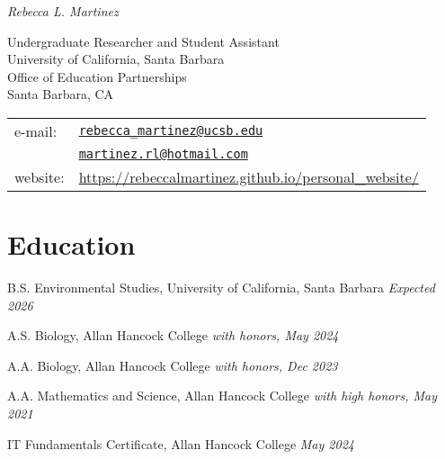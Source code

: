 \documentclass[letterpaper]{article}
\renewenvironment{itemize}{
  \begin{list}{}{
    \setlength{\leftmargin}{1.5em}
  }
}{
  \end{list}
}
\begin{document}
\centerline{\huge}
\begin{center}
  \emph{Rebecca L. Martinez}
\end{center}


\vspace{0.25in}

\begin{minipage}{0.55\linewidth}
Undergraduate Researcher and Student Assistant\\
University of California, Santa Barbara\\
Office of Education Partnerships\\
Santa Barbara, CA
\end{minipage}
\begin{minipage}{0.45\linewidth}
  \begin{tabular}{ll}
    e-mail: & \href{mailto:rebecca_martinez@ucsb.edu}{\tt rebecca\_martinez@ucsb.edu} \\
            & \href{mailto:martinez.rl@hotmail.com}{\tt martinez.rl@hotmail.com} \\
    website: & \href{https://rebeccalmartinez.github.io/personal_website/}{\url{https://rebeccalmartinez.github.io/personal_website/}}

  \end{tabular}
\end{minipage}


\section*{Education}


\begin{itemize}
  \item B.S. Environmental Studies, University of California, Santa Barbara  
  \emph{Expected 2026}

  \item A.S. Biology, Allan Hancock College  
  \emph{with honors, May 2024}

  \item A.A. Biology, Allan Hancock College  
  \emph{with honors, Dec 2023}

  \item A.A. Mathematics and Science, Allan Hancock College  
  \emph{with high honors, May 2021}

  \item IT Fundamentals Certificate, Allan Hancock College  
  \emph{May 2024}
\end{itemize}
\end{document}
